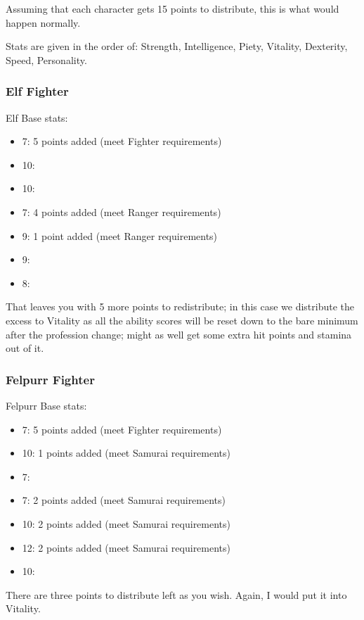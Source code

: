 \documentclass[12pt]{article}
\providecommand{\tightlist}{%
  \setlength{\itemsep}{0pt}\setlength{\parskip}{0pt}}
\begin{document}
Assuming that each character gets 15 points to distribute, this is what
would happen normally.

Stats are given in the order of: Strength, Intelligence, Piety,
Vitality, Dexterity, Speed, Personality.

\subsubsection{Elf Fighter}
\label{sec:elf-fighter}

Elf Base stats:

\begin{itemize}
\tightlist
\item
  7: 5 points added (meet Fighter requirements)
\item
  10:
\item
  10:
\item
  7: 4 points added (meet Ranger requirements)
\item
  9: 1 point added (meet Ranger requirements)
\item
  9:
\item
  8:
\end{itemize}

That leaves you with 5 more points to redistribute; in this case we
distribute the excess to Vitality as all the ability scores will be
reset down to the bare minimum after the profession change; might as
well get some extra hit points and stamina out of it.

\subsubsection{Felpurr Fighter}
\label{sec:felpurr-fighter}

Felpurr Base stats:

\begin{itemize}
\tightlist
\item
  7: 5 points added (meet Fighter requirements)
\item
  10: 1 points added (meet Samurai requirements)
\item
  7:
\item
  7: 2 points added (meet Samurai requirements)
\item
  10: 2 points added (meet Samurai requirements)
\item
  12: 2 points added (meet Samurai requirements)
\item
  10:
\end{itemize}

There are three points to distribute left as you wish. Again, I would
put it into Vitality.
\end{document}
